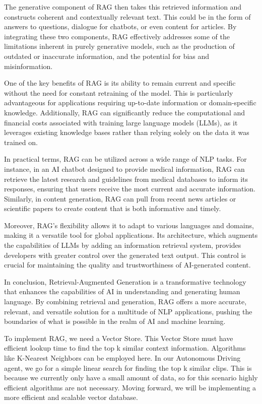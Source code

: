 \begin{spacing}{1.5}
\begin{sloppypar}
The generative component of RAG then takes this retrieved information and constructs coherent and contextually relevant text. This could be in the form of answers to questions, dialogue for chatbots, or even content for articles. By integrating these two components, RAG effectively addresses some of the limitations inherent in purely generative models, such as the production of outdated or inaccurate information, and the potential for bias and misinformation.

One of the key benefits of RAG is its ability to remain current and specific without the need for constant retraining of the model. This is particularly advantageous for applications requiring up-to-date information or domain-specific knowledge. Additionally, RAG can significantly reduce the computational and financial costs associated with training large language models (LLMs), as it leverages existing knowledge bases rather than relying solely on the data it was trained on.

In practical terms, RAG can be utilized across a wide range of NLP tasks. For instance, in an AI chatbot designed to provide medical information, RAG can retrieve the latest research and guidelines from medical databases to inform its responses, ensuring that users receive the most current and accurate information. Similarly, in content generation, RAG can pull from recent news articles or scientific papers to create content that is both informative and timely.

Moreover, RAG's flexibility allows it to adapt to various languages and domains, making it a versatile tool for global applications. Its architecture, which augments the capabilities of LLMs by adding an information retrieval system, provides developers with greater control over the generated text output. This control is crucial for maintaining the quality and trustworthiness of AI-generated content.

In conclusion, Retrieval-Augmented Generation is a transformative technology that enhances the capabilities of AI in understanding and generating human language. By combining retrieval and generation, RAG offers a more accurate, relevant, and versatile solution for a multitude of NLP applications, pushing the boundaries of what is possible in the realm of AI and machine learning.



To implement RAG, we need a Vector Store. This Vector Store must have efficient lookup time to find the top k similar context information. Algorithms like K-Nearest Neighbors can be employed here. In our Autonomous Driving agent, we go for a simple linear search for finding the top k similar clips. This is because we currently only have a small amount of data, so for this scenario highly efficient algorithms are not necessary. Moving forward, we will be implementing a more efficient and scalable vector database.



\end{sloppypar}
\end{spacing}
